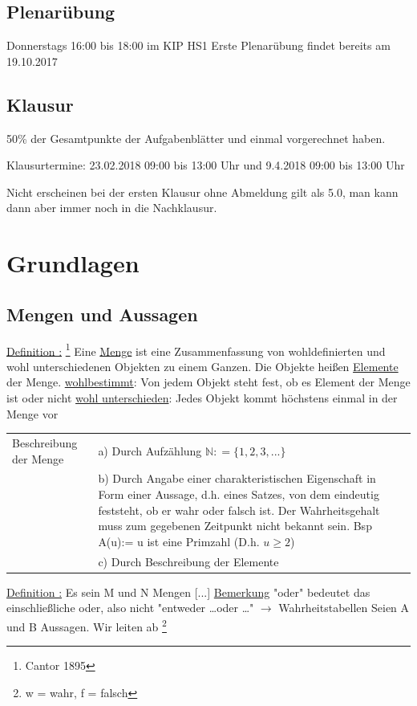 \documentclass[12pt,a4paper]{article} %
\newcounter{Definition}[section]
\newcounter{Satz}[section]
\newcommand{\Definition}{
	\stepcounter{Definition}
	\underline{Definition \theDefinition:}
}
\begin{document}
\subsection{Plenarübung}
Donnerstags 16:00 bis 18:00 im KIP HS1 \newline
Erste Plenarübung findet bereits am 19.10.2017

\subsection{Klausur}
50\% der Gesamtpunkte der Aufgabenblätter und einmal vorgerechnet haben.

Klausurtermine: 23.02.2018 09:00 bis 13:00 Uhr und 9.4.2018 09:00 bis 13:00 Uhr

Nicht erscheinen bei der ersten Klausur ohne Abmeldung gilt als 5.0, man kann dann aber immer noch in die Nachklausur.

\section{Grundlagen}
\subsection{Mengen und Aussagen}

\Definition \footnote{Cantor 1895}
Eine \underline{Menge} ist eine Zusammenfassung von wohldefinierten und wohl unterschiedenen Objekten zu einem Ganzen. Die Objekte heißen \underline{Elemente} der Menge. \newline
\underline{wohlbestimmt}: Von jedem Objekt steht fest, ob es Element der Menge ist oder nicht \newline
\underline{wohl unterschieden}: Jedes Objekt kommt höchstens einmal in der Menge vor \newline
\begin{tabular}{l l}
Beschreibung der Menge & a) Durch Aufzählung $\mathbb{N}: = \{1, 2, 3, ...\} $\\
& \parbox[t]{8cm}{b) Durch Angabe einer charakteristischen Eigenschaft in Form einer Aussage, d.h. eines Satzes, von dem eindeutig feststeht, ob er wahr oder falsch ist. Der Wahrheitsgehalt muss zum gegebenen Zeitpunkt nicht bekannt sein.
	Bsp A(u):= u ist eine Primzahl (D.h. $u \ge 2$)} \\
& c) Durch Beschreibung der Elemente 
\end{tabular}
\Definition Es sein M und N Mengen
[...]
\newline
\underline{Bemerkung}
"oder" bedeutet das einschließliche oder, also nicht "{}entweder \dots oder \dots" $\rightarrow$ Wahrheitstabellen \newline
Seien A und B Aussagen. Wir leiten ab \footnote{w = wahr, f = falsch}
\end{document}
